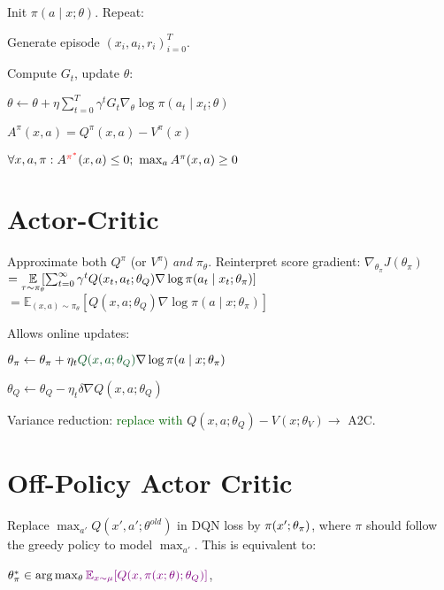 Init $\pi(a \mid x; \theta)$. Repeat: 

Generate episode $(x_i, a_i, r_i)_{i=0}^T.$

Compute ${G_t}$, update $\theta$:

{$\theta \leftarrow \theta + \eta \sum_{t=0}^T\gamma^t {G_t} \nabla_\theta \log \pi(a_t \mid x_t; \theta)$}




{$A^\pi(x,a) = Q^\pi(x,a) - V^\pi(x)$}

$\forall x,a, \pi: A^{\textcolor{red}{\pi^*}}(x,a) \leq 0; \ \max_a A^\pi(x,a) \geq 0$



\section{Actor-Critic} %
Approximate both $Q^\pi$ (or $V^\pi$) \textit{and} $\pi_\theta$. Reinterpret score gradient:
{$\nabla_{\theta_\pi} J(\theta_\pi)$}$= \hspace*{0mm} \underset{\tau \sim \pi_\theta}{\mathbb{E}} \hspace*{-1mm} [\sum_{t=0}^\infty \gamma^t Q(x_t, a_t; \theta_Q) \nabla \log \pi(a_t \mid x_t; \theta_\pi)]$
{$ = \mathbb{E}_{(x,a) \sim \pi_\theta} [Q(x,a;\theta_Q) \nabla \log \pi(a \mid x; \theta_\pi)]$}

Allows online updates:

$\theta_\pi \leftarrow \theta_\pi + \eta_t \textcolor{darkgreen}{Q(x,a;\theta_Q)} \nabla \log \pi(a \mid x; \theta_\pi)$

$\theta_Q \leftarrow \theta_Q  - \eta_t \delta \nabla Q(x,a;\theta_Q)$

Variance reduction: \textcolor{darkgreen}{replace with} $Q(x,a;\theta_Q) - V(x; \theta_V)\rightarrow$ A2C.

\section{Off-Policy Actor Critic} %

Replace ${\max_{a'} Q(x', a'; \theta^{old})}$ in DQN loss
by $\textcolor{black}{\pi(x'; \theta_\pi)}$, where $\pi$ should follow
the greedy policy to model ${\max_{a'}}$. This is equivalent to:

$\theta_\pi^* \in \arg\max_\theta \textcolor{violet}{\mathbb{E}_{x \sim \mu} [Q(x,\pi(x;\theta); \theta_Q)]}$,

